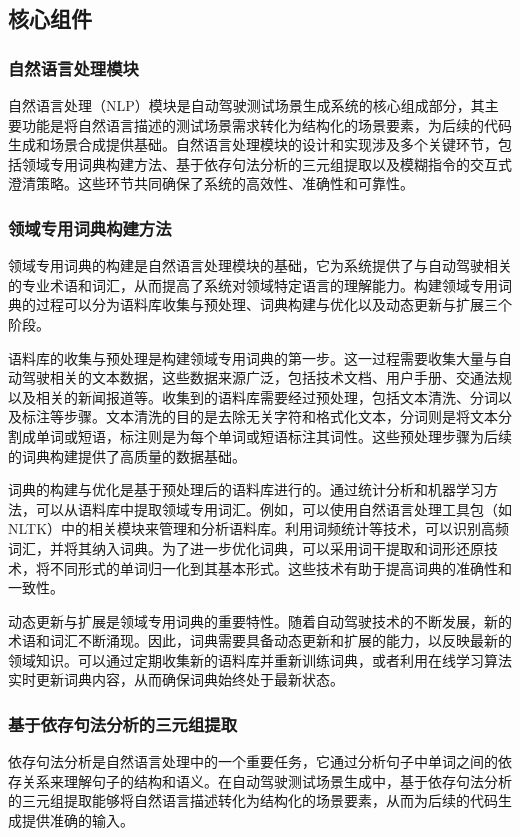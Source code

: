 \documentclass{article}
\begin{document}
\subsection{核心组件}
\subsubsection{自然语言处理模块}
自然语言处理（NLP）模块是自动驾驶测试场景生成系统的核心组成部分，其主要功能是将自然语言描述的测试场景需求转化为结构化的场景要素，为后续的代码生成和场景合成提供基础。自然语言处理模块的设计和实现涉及多个关键环节，包括领域专用词典构建方法、基于依存句法分析的三元组提取以及模糊指令的交互式澄清策略。这些环节共同确保了系统的高效性、准确性和可靠性。

\subsubsection{领域专用词典构建方法}
领域专用词典的构建是自然语言处理模块的基础，它为系统提供了与自动驾驶相关的专业术语和词汇，从而提高了系统对领域特定语言的理解能力。构建领域专用词典的过程可以分为语料库收集与预处理、词典构建与优化以及动态更新与扩展三个阶段。

语料库的收集与预处理是构建领域专用词典的第一步。这一过程需要收集大量与自动驾驶相关的文本数据，这些数据来源广泛，包括技术文档、用户手册、交通法规以及相关的新闻报道等。收集到的语料库需要经过预处理，包括文本清洗、分词以及标注等步骤。文本清洗的目的是去除无关字符和格式化文本，分词则是将文本分割成单词或短语，标注则是为每个单词或短语标注其词性。这些预处理步骤为后续的词典构建提供了高质量的数据基础。

词典的构建与优化是基于预处理后的语料库进行的。通过统计分析和机器学习方法，可以从语料库中提取领域专用词汇。例如，可以使用自然语言处理工具包（如NLTK）中的相关模块来管理和分析语料库。利用词频统计等技术，可以识别高频词汇，并将其纳入词典。为了进一步优化词典，可以采用词干提取和词形还原技术，将不同形式的单词归一化到其基本形式。这些技术有助于提高词典的准确性和一致性。

动态更新与扩展是领域专用词典的重要特性。随着自动驾驶技术的不断发展，新的术语和词汇不断涌现。因此，词典需要具备动态更新和扩展的能力，以反映最新的领域知识。可以通过定期收集新的语料库并重新训练词典，或者利用在线学习算法实时更新词典内容，从而确保词典始终处于最新状态。

\subsubsection{基于依存句法分析的三元组提取}
依存句法分析是自然语言处理中的一个重要任务，它通过分析句子中单词之间的依存关系来理解句子的结构和语义。在自动驾驶测试场景生成中，基于依存句法分析的三元组提取能够将自然语言描述转化为结构化的场景要素，从而为后续的代码生成提供准确的输入。
\end{document}
